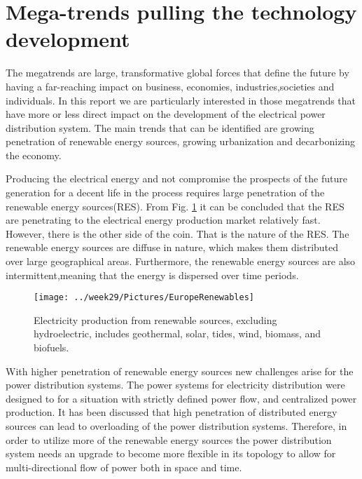 \documentclass[]{scrartcl}
\begin{document}

\section{Mega-trends pulling the technology development}

The megatrends are large, transformative global forces that define the future by having a far-reaching impact on business, economies, industries,societies and individuals\cite{EY2015}. In this report we are particularly interested in those megatrends that have more or less direct impact on the development of the electrical power distribution system. The main trends that can be identified are growing penetration of renewable energy sources, growing urbanization and decarbonizing the economy. 


Producing the electrical energy and not compromise the prospects of the future generation for a decent life in the process requires large penetration of the renewable energy sources(RES).  From Fig. \ref{fig:europerenewables} it can be concluded that the RES are penetrating to the electrical energy production market relatively fast. However, there is the other side of the coin. That is the nature of the RES. The renewable energy sources are diffuse in nature, which makes them distributed over large geographical areas. Furthermore, the renewable energy sources are also intermittent,meaning that the energy is dispersed over time periods. 

\begin{figure}[h!]
	\centering
	\texttt{[image: ../week29/Pictures/EuropeRenewables]}
	\caption{Electricity production from renewable sources, excluding hydroelectric, includes geothermal, solar, tides, wind, biomass, and biofuels.}
	\label{fig:europerenewables}
\end{figure}
\newpage


With higher penetration of renewable energy sources new challenges arise for the power distribution systems. The power systems for electricity distribution were designed to for a situation with strictly defined power flow, and centralized power production.  It has been discussed that high penetration of distributed energy sources can lead to overloading of the power distribution systems\cite{Garrity2009}.
Therefore, in order to utilize more of the renewable energy sources the power distribution system needs an upgrade to become more flexible in its topology to allow for multi-directional flow of power both in space and time\cite{Doncker2014}. 
\end{document}
